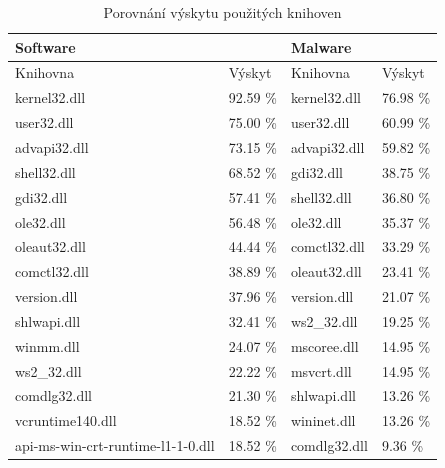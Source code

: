 \begin{table}[H]
    \caption{Porovnání výskytu použitých knihoven}
    \label{table:libs_table}

    \centering
    \begin{tabular}{|l|l|l|l|}
        \hline
        \multicolumn{2}{|l|}{Software}                & \multicolumn{2}{|l|}{Malware} \\ \hline
        Knihovna                          & Výskyt  & Knihovna        & Výskyt    \\ 
        \hline
    	\hline
        kernel32.dll                      & 92.59 \% & kernel32.dll    & 76.98 \%   \\ \hline
        user32.dll                        & 75.00 \% & user32.dll      & 60.99 \%   \\ \hline
        advapi32.dll                      & 73.15 \% & advapi32.dll    & 59.82 \%   \\ \hline
        shell32.dll                       & 68.52 \% & gdi32.dll       & 38.75 \%   \\ \hline
        gdi32.dll                         & 57.41 \% & shell32.dll     & 36.80 \%   \\ \hline
        ole32.dll                         & 56.48 \% & ole32.dll       & 35.37 \%   \\ \hline
        oleaut32.dll                      & 44.44 \% & comctl32.dll    & 33.29 \%   \\ \hline
        comctl32.dll                      & 38.89 \% & oleaut32.dll    & 23.41 \%   \\ \hline
        version.dll                       & 37.96 \% & version.dll     & 21.07 \%   \\ \hline
        shlwapi.dll                       & 32.41 \% & ws2\_32.dll     & 19.25 \%   \\ \hline
        winmm.dll                         & 24.07 \% & mscoree.dll     & 14.95 \%   \\ \hline
        ws2\_32.dll                       & 22.22 \% & msvcrt.dll      & 14.95 \%   \\ \hline
        comdlg32.dll                      & 21.30 \% & shlwapi.dll     & 13.26 \%   \\ \hline
        vcruntime140.dll                  & 18.52 \% & wininet.dll     & 13.26 \%   \\ \hline
        api-ms-win-crt-runtime-l1-1-0.dll & 18.52 \% & comdlg32.dll    & 9.36 \%    \\ \hline
    \end{tabular}
\end{table}

